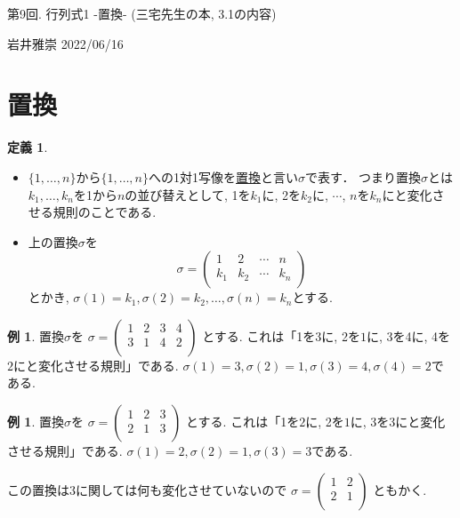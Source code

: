 \documentclass[dvipdfmx,a4paper,11pt]{article}
\theoremstyle{definition}
\newtheorem{dfn}[thm]{定義}
\newtheorem{exa}[thm]{例}
\begin{document}
\begin{center}
{\Large 第9回. 行列式1 -置換- (三宅先生の本, 3.1の内容)}
\end{center}

\begin{flushright}
 岩井雅崇 2022/06/16
\end{flushright}

\section{置換}

\begin{tcolorbox}[
    colback = white,
    colframe = green!35!black,
    fonttitle = \bfseries,
    breakable = true]
    \begin{dfn}
    \text{}
    \begin{itemize}
\item $\{ 1, \ldots, n\}$から$\{ 1, \ldots, n\}$への1対1写像を\underline{置換}と言い$\sigma$で表す．
つまり置換$\sigma$とは$k_1, \ldots, k_n$を1から$n$の並び替えとして, 
1を$k_1$に, 2を$k_2$に, $\cdots$, $n$を$k_n$にと変化させる規則のことである.
\item 上の置換$\sigma$を
$$
\sigma =
  \begin{pmatrix}
 1& 2  &\cdots &n\\
 k_1& k_2  &\cdots &k_n\\
 \end{pmatrix} 
$$
とかき, $\sigma(1) =k_1, \sigma(2) =k_2, \ldots, \sigma(n) =k_n$とする.
    \end{itemize}
  \end{dfn}
 \end{tcolorbox}
 
 \begin{exa}
 置換$\sigma$を
$
\sigma =
  \begin{pmatrix}
 1& 2  &3 &4\\
 3& 1  &4 &2\\
 \end{pmatrix} 
$
とする. 
これは「1を$3$に, 2を$1$に, 3を4に, 4を$2$にと変化させる規則」である.
 $\sigma(1) =3, \sigma(2) =1, \sigma(3) =4,  \sigma(4) =2$である.
 \end{exa}
 
 \begin{exa}
 置換$\sigma$を
$
\sigma =
  \begin{pmatrix}
 1& 2  &3 \\
 2& 1  &3 \\
 \end{pmatrix} 
$
とする. 
これは「1を$2$に, 2を$1$に, 3を3にと変化させる規則」である.
 $\sigma(1) =2, \sigma(2) =1, \sigma(3) =3$である.
 
 この置換は3に関しては何も変化させていないので
 $
\sigma =
  \begin{pmatrix}
 1& 2   \\
 2& 1   \\
 \end{pmatrix} 
$
ともかく.
 \end{exa}
\end{document}
